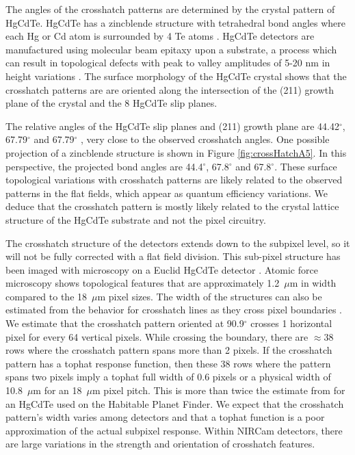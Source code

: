 \documentclass{aastex62}
\newcommand{\degree}{^\circ}
\begin{document}
The angles of the crosshatch patterns are determined by the crystal pattern of HgCdTe.
HgCdTe has a zincblende structure with tetrahedral bond angles where each Hg or Cd atom is surrounded by 4 Te atoms \citep{gemain2012mercVacanciesHgCdTe}.
HgCdTe detectors are manufactured using molecular beam epitaxy upon a substrate, a process which can result in topological defects with peak to valley amplitudes of 5-20 nm in height variations \citep{chang2008surfaceMorphologyHgCdTe}.
The surface morphology of the HgCdTe crystal shows that the crosshatch patterns are are oriented along the intersection of the (211) growth plane of the crystal and the 8 HgCdTe slip planes.

The relative angles of the HgCdTe slip planes and (211) growth plane are 44.42$\degree$, 67.79$\degree$ and 67.79$\degree$ \citep{chang2008surfaceMorphologyHgCdTe}, very close to the observed crosshatch angles.
One possible projection of a zincblende structure is shown in Figure \ref{fig:crossHatchA5}.
In this perspective, the projected bond angles are 44.4$\degree$, 67.8$\degree$ and 67.8$\degree$.
These surface topological variations with crosshatch patterns are likely related to the observed patterns in the flat fields, which appear as quantum efficiency variations.
We deduce that the crosshatch pattern is mostly likely related to the crystal lattice structure of the HgCdTe substrate and not the pixel circuitry.

The crosshatch structure of the detectors extends down to the subpixel level, so it will not be fully corrected with a flat field division.
This sub-pixel structure has been imaged with microscopy on a Euclid HgCdTe detector \citep{shapiro2018crosshatch}.
Atomic force microscopy shows topological features that are approximately 1.2~$\mu$m in width \citep{chang2008surfaceMorphologyHgCdTe} compared to the 18~$\mu$m pixel sizes.
The width of the structures can also be estimated from the behavior for crosshatch lines as they cross pixel boundaries \citep{ninan2019crosshatchHPF}.
We estimate that the crosshatch pattern oriented at 90.9$\degree$ crosses 1 horizontal pixel for every 64 vertical pixels.
While crossing the boundary, there are $\approx 38$ rows where the crosshatch pattern spans more than 2 pixels.
If the crosshatch pattern has a tophat response function, then these 38 rows where the pattern spans two pixels imply a tophat full width of 0.6 pixels or a physical width of 10.8~$\mu$m for an 18~$\mu$m pixel pitch.
This is more than twice the estimate from \citet{ninan2019crosshatchHPF} for an HgCdTe used on the Habitable Planet Finder.
We expect that the crosshatch pattern's width varies among detectors and that a tophat function is a poor approximation of the actual subpixel response.
Within NIRCam detectors, there are large variations in the strength and orientation of crosshatch features.
\end{document}
